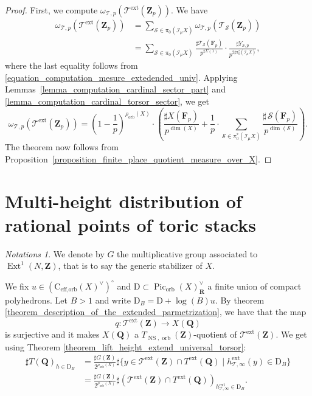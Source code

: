 \documentclass{proc-l}
\newcommand{\R}{\mathbf{R}}
\newcommand{\Z}{\mathbf{Z}}
\newcommand{\Q}{\mathbf{Q}}
\newcommand{\F}{\mathbf{F}}
\newcommand{\coneorb}{\text{C}_{\text{eff},\text{orb}}(X)}
\DeclareMathOperator{\Pic}{Pic}
\DeclareMathOperator{\Ext}{Ext}
\DeclareMathOperator{\NS}{NS}
\DeclareMathOperator{\orb}{orb}
\DeclareMathOperator{\ext}{ext}
\newcommand{\stackS}{\mathcal{S}}
\newcommand{\stackT}{\mathcal{T}}
\newcommand{\sheafI}{\mathcal{I}}
\newcommand{\w}{\omega}
\newcommand{\sector}{\pi_0(\sheafI_{\mu} X)}
\newcommand{\twistsector}{\pi_0^*(\sheafI_{\mu} X)}
\theoremstyle{definition}
\theoremstyle{remark}
\newtheorem{Notations}[theorem]{Notations}
\numberwithin{equation}{section}
\begin{document}
\begin{proof}
First, we compute $\w_{\stackT,p}(\stackT^{\ext}(\Z_p))$. We have
\begin{align*}
\w_{\stackT,p}(\stackT^{\ext}(\Z_p))
&= \sum_{\stackS \in \sector} \w_{\stackT,p}(\stackT_{\stackS}(\Z_p)) \\
&= \sum_{\stackS \in \sector}
\frac{\sharp \stackT_{\stackS}(\F_p)}{p^{\sharp \Sigma(1)}}
\cdot
\frac{\sharp Y_{\stackS,p}}{p^{2 \sharp \twistsector}},
\end{align*}
where the last equality follows from \eqref{equation_computation_mesure_extedended_univ}. 
Applying Lemmas~\ref{lemma_computation_cardinal_sector_part} and 
\ref{lemma_computation_cardinal_torsor_sector}, we get
\[
\w_{\stackT,p}(\stackT^{\ext}(\Z_p))
=
\left(1-\frac{1}{p}\right)^{\rho_{\orb}(X)}
\cdot
\left( \frac{\sharp X(\F_p)}{p^{\dim(X)}}  + \frac{1}{p} \cdot
\sum\limits_{\stackS \in \twistsector} 
\frac{\sharp\, \stackS\!\left(\F_p\right)}{p^{\dim(\stackS)}} \right) .
\]
The theorem now follows from Proposition~\ref{proposition_finite_place_quotient_measure_over_X}.
\end{proof}

\section{Multi-height distribution of rational points of toric stacks}

\begin{Notations}
    We denote by $G$ the multiplicative group associated to $\Ext^1(N,\Z)$, that is to say the generic stabilizer of $X$.
\end{Notations}

We fix $u \in (\coneorb^{\vee})^{\circ}$ and $\mathrm{D} \subset \Pic_{\orb}(X)^{\vee}_{\R}$ a finite union of compact polyhedrons. Let $B > 1$ and write $\mathrm{D}_B = \mathrm{D} + \log(B) u $. By theorem \ref{theorem_description_of_the_extended_parmetrization}, we have that the map
$$ q : \stackT^{\ext}(\Z) \rightarrow X(\Q)$$is surjective and it makes $X(\Q)$ a $T_{\NS,\orb}(\Z)$-quotient of $\stackT^{\ext}(\Z)$. We get using Theorem \ref{theorem_lift_height_extend_universal_torsor}:
\begin{align*}
    \sharp T(\Q)_{h \in \mathrm{D}_B} &= \frac{ \sharp G(\Z)}{2^{\rho_{\orb}(X)}} \sharp \{ y \in \stackT^{\ext}(\Z) \cap T^{\ext}(\Q) \mid h^{\ext}_{\stackT,\infty}(y) \in \mathrm{D}_B \} \\
    &= \frac{ \sharp G(\Z)}{2^{\rho_{\orb}(X)}} \sharp \left( \stackT^{\ext}(\Z) \cap T^{\ext}(\Q) \right)_{h^{\ext}_{\stackT,\infty} \in \mathrm{D}_B} .
\end{align*}
\end{document}
